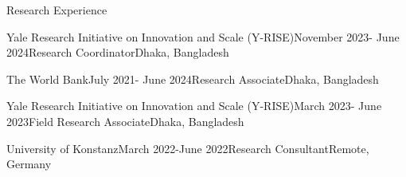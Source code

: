 \documentclass[
	11pt, %
]{resume} %
\begin{document}
	\vspace{-10pt}
\begin{rSection}{Research Experience}


	\begin{rSubsection}{Yale Research Initiative on Innovation and Scale (Y-RISE)}{November 2023- June 2024}{Research Coordinator}{Dhaka, Bangladesh}
	\end{rSubsection}




	\vspace{-5pt}
	\begin{rSubsection}{The World Bank}{July 2021- June 2024}{Research Associate}{Dhaka, Bangladesh}
	\end{rSubsection}


	\vspace{-5pt}
\begin{rSubsection}{Yale Research Initiative on Innovation and Scale (Y-RISE)}{March 2023- June 2023}{Field Research Associate}{Dhaka, Bangladesh}
	\end{rSubsection}


\vspace{-5pt}
	\begin{rSubsection}{University of Konstanz}{March 2022-June 2022}{Research Consultant}{Remote, Germany}
	\end{rSubsection}
\end{rSection}
\end{document}
